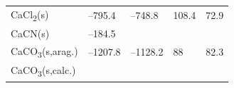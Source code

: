 \documentclass[
  9pt,
]{extbook}
\theoremstyle{definition}
\theoremstyle{definition}
\theoremstyle{definition}
\theoremstyle{remark}
\begin{document}
\begin{longtable}[]{@{}lllll@{}}
\begin{minipage}[t]{0.10\columnwidth}
CaCl\textsubscript{2}(s)\strut
\end{minipage} & \begin{minipage}[t]{0.19\columnwidth}\raggedright
--795.4\strut
\end{minipage} & \begin{minipage}[t]{0.20\columnwidth}\raggedright
--748.8\strut
\end{minipage} & \begin{minipage}[t]{0.18\columnwidth}\raggedright
108.4\strut
\end{minipage} & \begin{minipage}[t]{0.18\columnwidth}\raggedright
72.9\strut
\end{minipage}\tabularnewline
\begin{minipage}[t]{0.10\columnwidth}\raggedright
CaCN(s)\strut
\end{minipage} & \begin{minipage}[t]{0.19\columnwidth}\raggedright
--184.5\strut
\end{minipage} & \begin{minipage}[t]{0.20\columnwidth}\raggedright
\strut
\end{minipage} & \begin{minipage}[t]{0.18\columnwidth}\raggedright
\strut
\end{minipage} & \begin{minipage}[t]{0.18\columnwidth}\raggedright
\strut
\end{minipage}\tabularnewline
\begin{minipage}[t]{0.10\columnwidth}\raggedright
CaCO\textsubscript{3}(s,arag.)\strut
\end{minipage} & \begin{minipage}[t]{0.19\columnwidth}\raggedright
--1207.8\strut
\end{minipage} & \begin{minipage}[t]{0.20\columnwidth}\raggedright
--1128.2\strut
\end{minipage} & \begin{minipage}[t]{0.18\columnwidth}\raggedright
88\strut
\end{minipage} & \begin{minipage}[t]{0.18\columnwidth}\raggedright
82.3\strut
\end{minipage}\tabularnewline
\begin{minipage}[t]{0.10\columnwidth}\raggedright
CaCO\textsubscript{3}(s,calc.)\strut
\end{minipage} & \begin{minipage}[t]{0.19\columnwidth}\raggedright

\end{minipage}
\end{longtable}
\end{document}
